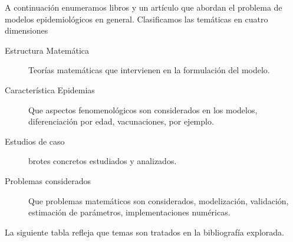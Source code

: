 \documentclass{article}
\begin{document}
A continuación enumeramos libros y un artículo que abordan el problema de modelos epidemiológicos en general. Clasificamos las temáticas en cuatro dimensiones
\begin{description}
 \item[Estructura Matemática] Teorías matemáticas que intervienen en la formulación del modelo. 
 \item[Característica Epidemias] Que aspectos fenomenológicos son considerados en los modelos, diferenciación por edad, vacunaciones,  por ejemplo.
 \item[Estudios de caso] brotes concretos estudiados y analizados. 
 \item[Problemas considerados] Que problemas matemáticos son considerados, modelización, validación, estimación de parámetros, implementaciones numéricas. 
\end{description}

La siguiente tabla refleja que temas son tratados en la bibliografía explorada.
\end{document}
